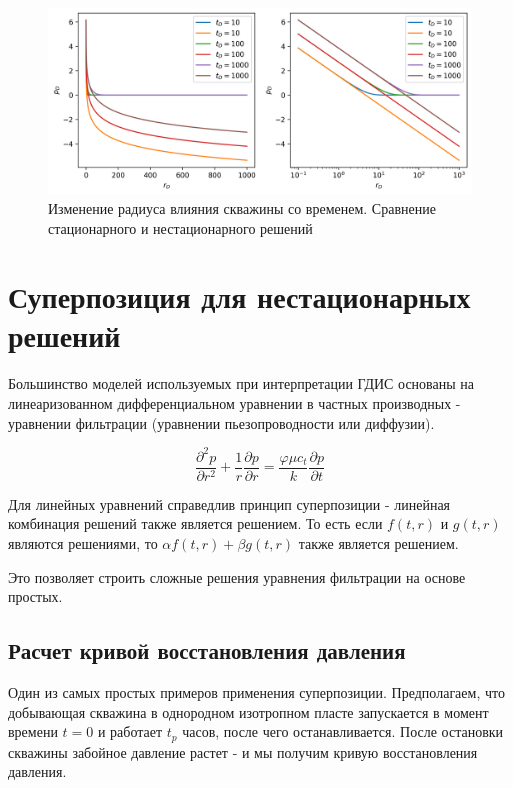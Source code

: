\begin{figure}[h!]
	\begin{center}
		\includegraphics[width=12cm]{pics/stac_radius_investigation_1.png}
		\caption{Изменение радиуса влияния скважины со временем. Сравнение стационарного и нестационарного решений}
		\label{ris:stac_radius_investigation_1}
	\end{center}
\end{figure}




\section{Суперпозиция для нестационарных решений}


Большинство моделей используемых при интерпретации ГДИС основаны на линеаризованном дифференциальном уравнении в частных производных - уравнении фильтрации (уравнении пьезопроводности или диффузии).

$$ \frac{\partial ^2 p }{\partial r^2} + \frac{1}{r} \frac{\partial p}{\partial r} = \frac{\varphi \mu c_t}{k} \frac{\partial p}{\partial t} $$

Для линейных уравнений справедлив принцип суперпозиции - линейная комбинация решений также является решением. То есть если $f(t,r)$ и $g(t,r)$ являются решениями, то $\alpha f(t,r) + \beta g(t,r)$  также является решением.

Это позволяет строить сложные решения уравнения фильтрации на основе простых.

\subsection{Расчет кривой восстановления давления}

Один из самых простых примеров применения суперпозиции. Предполагаем, что добывающая скважина в однородном изотропном пласте запускается в момент времени $t=0$ и работает $t_{p}$ часов, после чего останавливается. После остановки скважины забойное давление растет - и мы получим кривую восстановления давления.

